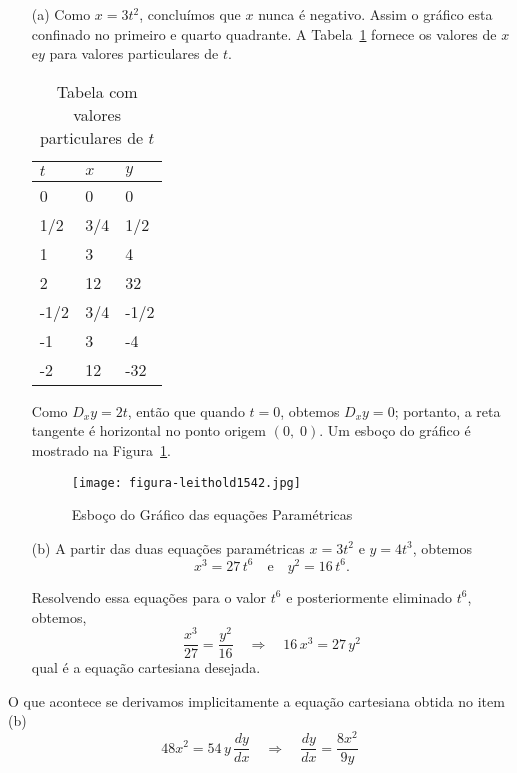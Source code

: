 \begin{enumerate}
\item[(a)]
Como \(x = 3t^{2}\), concluímos que \(x\) nunca é negativo. Assim o gráfico esta confinado no primeiro e quarto quadrante. A Tabela~\ref{tab:1541}
fornece os valores de \(x\) e\(y\) para valores particulares de \(t\).
\begin{table}[H]
\centering
\begin{tabular}{m{5em} m{5em} m{5em}}
	\toprule[2pt]
\(t\)	& \(x\) & \(y\) \\
	\midrule[1.5pt]
0	& 0 & 0  \\
	\midrule
1/2	& 3/4 & 1/2  \\
	\midrule
1	& 3 & 4 \\
	\midrule
2	& 12 & 32  \\
	\midrule
-1/2	&3/4  & -1/2  \\
	\midrule
-1	&3  & -4 \\
	\midrule
-2	& 12 & -32 \\
	\bottomrule[2.0pt]
\end{tabular}
 \caption{Tabela com valores particulares de \(t\)}\label{tab:1541}
\end{table}

Como \(D_{x}y = 2t\), então que quando \(t = 0\), obtemos \(D_{x}y = 0\); portanto, a reta tangente é horizontal no ponto origem \((0,\; 0)\). Um esboço do gráfico é mostrado na Figura~\ref{fig:1542}.
\begin{figure}[H]
\centering
\texttt{[image: figura-leithold1542.jpg]}
\caption{Esboço do Gráfico das equações Paramétricas}\label{fig:1542}
\end{figure}

\item[(b)]
A partir das duas equações paramétricas \(x = 3t^{2}\) e \(y = 4t^{3}\), obtemos
\begin{equation*}
x^{3} = 27\,t^{6} \quad \text{e} \quad y^{2} = 16\,t^{6}.
\end{equation*}

Resolvendo essa equações para o valor \(t^{6}\) e posteriormente eliminado \( t^{6}\), obtemos,
\begin{equation*}
  \frac{x^{3}}{27}=\frac{y^{2}}{16} \quad \Rightarrow \quad 16\, x^{3} = 27\, y^{2}
\end{equation*}
qual é a equação cartesiana desejada.
\end{enumerate}

O que acontece se derivamos implicitamente a equação cartesiana obtida no item (b)
\begin{equation*}
  48x^{2}=54\,y\,\frac{dy}{dx}\quad \Rightarrow \quad \frac{dy}{dx}=\frac{8x^{2}}{9y}
\end{equation*}

